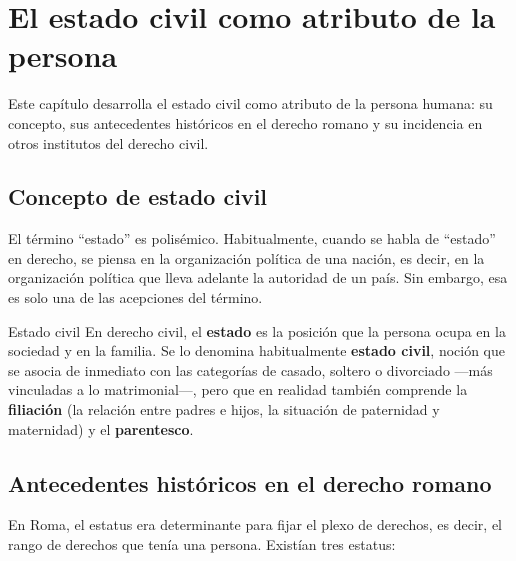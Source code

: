 \documentclass[12pt,oneside]{book}
\begin{document}
\tableofcontents

\chapter{El estado civil como atributo de la persona}

Este capítulo desarrolla el estado civil como atributo de la persona humana: su concepto, sus antecedentes históricos en el derecho romano y su incidencia en otros institutos del derecho civil.

\section{Concepto de estado civil}

El término ``estado'' es polisémico. Habitualmente, cuando se habla de ``estado'' en derecho, se piensa en la organización política de una nación, es decir, en la organización política que lleva adelante la autoridad de un país. Sin embargo, esa es solo una de las acepciones del término.

\begin{definition}{Estado civil}
En derecho civil, el \textbf{estado} es la posición que la persona ocupa en la sociedad y en la familia. Se lo denomina habitualmente \textbf{estado civil}, noción que se asocia de inmediato con las categorías de casado, soltero o divorciado —más vinculadas a lo matrimonial—, pero que en realidad también comprende la \textbf{filiación} (la relación entre padres e hijos, la situación de paternidad y maternidad) y el \textbf{parentesco}.
\end{definition}

\section{Antecedentes históricos en el derecho romano}

En Roma, el estatus era determinante para fijar el plexo de derechos, es decir, el rango de derechos que tenía una persona. Existían tres estatus:
\end{document}
